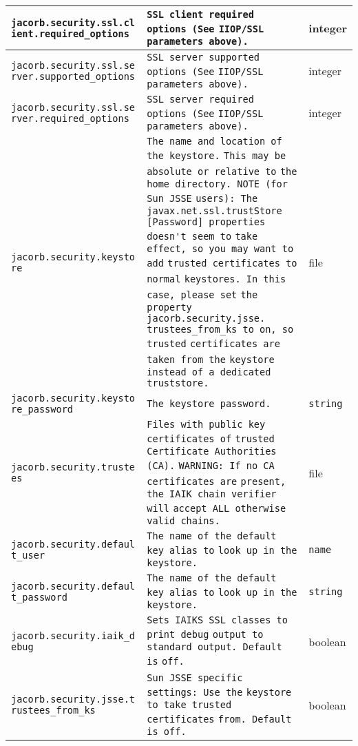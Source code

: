 \documentclass[12pt]{scrbook}
\begin{document}
\begin{small}
\begin{longtable}{|p{5cm}|p{9cm}|p{2cm}|}
\hline
\verb"jacorb.security.ssl.cl"
\verb"ient.required_options" & \verb"SSL client required options (See"
\verb"IIOP/SSL parameters above)." & integer \\
\hline
\verb"jacorb.security.ssl.se"
\verb"rver.supported_options" & \verb"SSL server supported options (See"
\verb"IIOP/SSL parameters above)." & integer \\
\hline
\verb"jacorb.security.ssl.se"
\verb"rver.required_options" & \verb"SSL server required options (See"
\verb"IIOP/SSL parameters above)." & integer \\
\hline
\verb"jacorb.security.keysto"
\verb"re" & \verb"The name and location of the keystore."
\verb"This may be absolute or relative to"
\verb"the home directory. NOTE (for Sun JSSE"
\verb"users): The javax.net.ssl.trustStore"
\verb"[Password] properties doesn't seem to"
\verb"take effect, so you may want to add"
\verb"trusted certificates to normal"
\verb"keystores. In this case, please set"
\verb"the property jacorb.security.jsse."
\verb"trustees_from_ks to on, so trusted"
\verb"certificates are taken from the"
\verb"keystore instead of a dedicated"
\verb"truststore." & file \\
\hline
\verb"jacorb.security.keysto"
\verb"re_password" & \verb"The keystore password." & \verb"string" \\
\hline
\verb"jacorb.security.truste"
\verb"es" & \verb"Files with public key certificates of"
\verb"trusted Certificate Authorities (CA)."
\verb"WARNING: If no CA certificates are"
\verb"present, the IAIK chain verifier will"
\verb"accept ALL otherwise valid chains." & file \\
\hline
\verb"jacorb.security.defaul"
\verb"t_user" & \verb"The name of the default key alias to"
\verb"look up in the keystore." & \verb"name" \\
\hline
\verb"jacorb.security.defaul"
\verb"t_password" & \verb"The name of the default key alias to"
\verb"look up in the keystore." & \verb"string" \\
\hline
\verb"jacorb.security.iaik_d"
\verb"ebug" & \verb"Sets IAIKS SSL classes to print debug"
\verb"output to standard output. Default is"
\verb"off." & boolean \\
\hline
\verb"jacorb.security.jsse.t"
\verb"rustees_from_ks" & \verb"Sun JSSE specific settings: Use the"
\verb"keystore to take trusted certificates"
\verb"from. Default is off." & boolean \\
\hline

\end{longtable}
\end{small}
\end{document}
